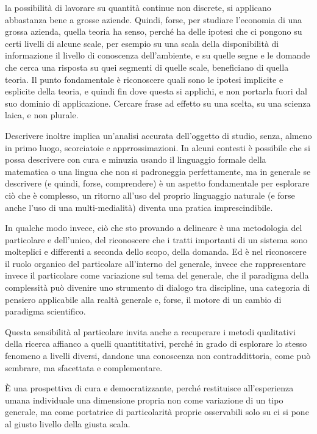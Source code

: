 \documentclass[a4paper, headings=standardclasses]{scrartcl}
\begin{document}
la possibilità di lavorare su quantità continue non discrete, si applicano abbastanza bene a grosse aziende.
Quindi, forse, per studiare l'economia di una grossa azienda, quella teoria ha senso,
perché ha delle ipotesi che ci pongono su certi livelli di alcune scale,
per esempio su una scala della disponibilità di informazione il livello di conoscenza dell'ambiente,
e su quelle segne e le domande che cerca una risposta su quei segmenti di quelle scale,
beneficiano di quella teoria.
Il punto fondamentale è riconoscere quali sono le ipotesi implicite e esplicite della teoria,
e quindi fin dove questa si applichi, e non portarla fuori dal suo dominio di applicazione.
Cercare frase ad effetto su una scelta, su una scienza laica, e non plurale.

Descrivere inoltre implica un'analisi accurata dell'oggetto di studio, senza, almeno in primo luogo, scorciatoie e apprrossimazioni. In alcuni contesti è possibile che si possa descrivere con cura e minuzia usando il linguaggio formale della matematica o una lingua che non si padroneggia perfettamente, ma in generale se descrivere (e quindi, forse, comprendere) è un aspetto fondamentale per esplorare ciò che è complesso, un ritorno all'uso del proprio linguaggio naturale (e forse anche l'uso di una multi-medialità) diventa una pratica imprescindibile.

In qualche modo invece, ciò che sto provando a delineare è una metodologia del particolare e dell'unico, del riconoscere che i tratti importanti di un sistema sono molteplici e differenti a seconda dello scopo, della domanda. Ed è nel riconoscere il ruolo organico del particolare all'interno del generale, invece che rappresentare invece il particolare come variazione sul tema del generale, che il paradigma della complessità può divenire uno strumento di dialogo tra discipline, una categoria di pensiero applicabile alla realtà generale e, forse, il motore di un cambio di paradigma scientifico.

Questa sensibilità al particolare invita anche a recuperare i metodi qualitativi della ricerca affianco a quelli quantititativi, perché in grado di esplorare lo stesso fenomeno a livelli diversi, dandone una conoscenza non contraddittoria, come può sembrare, ma sfacettata e complementare.

È una prospettiva di cura e democratizzante, perché restituisce all'esperienza umana individuale una dimensione propria non come variazione di un tipo generale, ma come portatrice di particolarità proprie osservabili solo su ci si pone al giusto livello della giusta scala.
\end{document}
